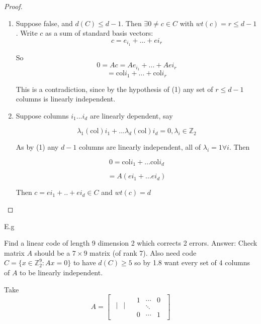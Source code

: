 \documentclass[amsfonts]{amsart}
\theoremstyle{definition}
\theoremstyle{remark}
\numberwithin{equation}{section}
\begin{document}
\begin{proof}
\begin{enumerate}
	\item\par Suppose false, and $d(C) \leq d-1$. Then $\exists 0 \neq c \in C$ with $wt(c) = r \leq d-1$. Write $c$ as a sum of standard basis vectors: 
	\[
		c = e_{i_1} + ... + e{i_r}
	\]

	So \[
		0 = Ac = Ae_{i_1} + ... + Ae{i_r} 
	\]
	\[
		= \text{col}i_1 + ... + \text{col}i_r
	\]

	This is a contradiction, since by the hypothesis of (1) any set of $r \leq d-1$ columns is linearly independent.

	\item\par 
	Suppose columns $i_1 ... i_d$ are linearly dependent, say

	\[
		\lambda_1 (\text{col})i_1 + ... \lambda_d(\text{col})i_d = 0, \lambda_i \in \mathbb{Z}_2
	\]

	As by (1) any $d-1$ columns are linearly independent, all of $\lambda_i = 1 \forall i$. Then 

	\[
		0 = \text{col}i_1 + ... \text{col}i_d
	\]

	\[
		= A(e{i_1} + ... e{i_d})
	\]

	Then $c = e{i_1} + .. + e{i_d} \in C$ and $wt(c) = d$
\end{enumerate}
\end{proof}

E.g

	Find a linear code of length 9 dimension 2 which corrects 2 errors.
	Answer:
	Check matrix $A$ should be a $7 \times 9$ matrix (of rank 7). 
	Also need code $C = \{x \in \mathbb{Z}_2^9: Ax = 0\}$ to have $d(C)\geq 5$ so by 1.8 want every set of 4 columns of $A$ to be linearly independent.

	Take
	\begin{equation*}
		A = \begin{bmatrix}
			\begin{matrix}
			| & | & \\
			\end{matrix}

			\begin{matrix}
			1 & \cdots & 0 \\
			  & \ddots & \\
			0 & \cdots & 1
			\end{matrix}
			\end{bmatrix}
	\end{equation*}
\end{document}
